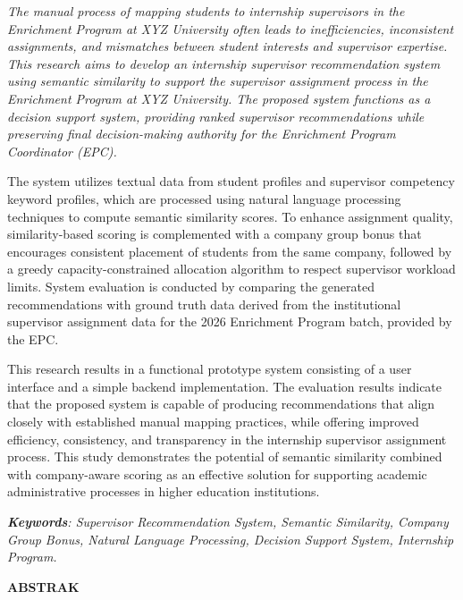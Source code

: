 \begin{singlespace}
{\itshape
The manual process of mapping students to internship supervisors in the Enrichment Program at XYZ University often leads to inefficiencies, inconsistent assignments, and mismatches between student interests and supervisor expertise. This research aims to develop an internship supervisor recommendation system using semantic similarity to support the supervisor assignment process in the Enrichment Program at XYZ University. The proposed system functions as a decision support system, providing ranked supervisor recommendations while preserving final decision-making authority for the \textit{Enrichment Program Coordinator} (EPC).

The system utilizes textual data from student profiles and supervisor competency keyword profiles, which are processed using natural language processing techniques to compute semantic similarity scores. To enhance assignment quality, similarity-based scoring is complemented with a company group bonus that encourages consistent placement of students from the same company, followed by a greedy capacity-constrained allocation algorithm to respect supervisor workload limits. System evaluation is conducted by comparing the generated recommendations with ground truth data derived from the institutional supervisor assignment data for the 2026 Enrichment Program batch, provided by the EPC.

This research results in a functional prototype system consisting of a user interface and a simple backend implementation. The evaluation results indicate that the proposed system is capable of producing recommendations that align closely with established manual mapping practices, while offering improved efficiency, consistency, and transparency in the internship supervisor assignment process. This study demonstrates the potential of semantic similarity combined with company-aware scoring as an effective solution for supporting academic administrative processes in higher education institutions.

\textit{\noindent\textbf{Keywords}: Supervisor Recommendation System, Semantic Similarity, Company Group Bonus, Natural Language Processing, Decision Support System, Internship Program.}

}
\end{singlespace}
\par


{\centering\fontsize{16}{19}\selectfont\textbf{ABSTRAK}\par}


